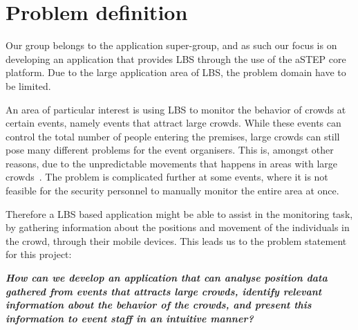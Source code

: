 \section{Problem definition} \label{sec:problem_def}
Our group belongs to the application super-group, and as such our focus is on developing an application that provides LBS through the use of the aSTEP core platform. Due to the large application area of LBS, the problem domain have to be limited. 

An area of particular interest is using LBS to monitor the behavior of crowds at certain events, namely events that attract large crowds. While these events can control the total number of people entering the premises, large crowds can still pose many different problems for the event organisers. This is, amongst other reasons, due to the unpredictable movements that happens in areas with large crowds~\cite{wirz2012inferring}. The problem is complicated further at some events, where it is not feasible for the security personnel to manually monitor the entire area at once. 

Therefore a LBS based application might be able to assist in the monitoring task, by gathering information about the positions and movement of the individuals in the crowd, through their mobile devices. This leads us to the problem statement for this project:

\vspace{0.5 cm}
\begin{center}
	\textbf{\textit{How can we develop an application that can analyse position data gathered from events that attracts large crowds, identify relevant information about the behavior of the crowds, and present this information to event staff in an intuitive manner?}}
\end{center}